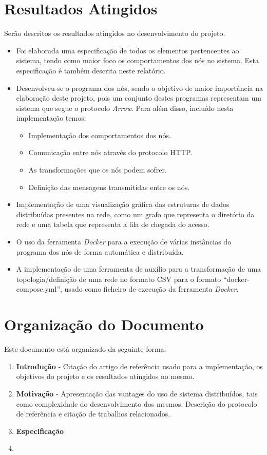 \section{Resultados Atingidos}
Serão descritos os resultados atingidos no desenvolvimento do projeto.

\begin{itemize}
    \item Foi elaborada uma especificação de todos os elementos pertencentes ao sistema, tendo como maior foco os comportamentos dos nós no sistema. Esta especificação é também descrita neste relatório. 
    \item Desenvolveu-se o programa dos nós, sendo o objetivo de maior importância na elaboração deste projeto, pois um conjunto destes programas representam um sistema que segue o protocolo \emph{Arrow}. Para além disso, incluído nesta implementação temos:

    \begin{itemize}
	\item Implementação dos comportamentos dos nós.
	\item Comunicação entre nós através do protocolo \acs{HTTP}.
	\item As transformações que os nós podem sofrer.
	\item Definição das mensagens transmitidas entre os nós.
    \end{itemize}

\item Implementação de uma visualização gráfica das estruturas de dados distribuídas presentes na rede, como um grafo que representa o diretório da rede e uma tabela que representa a fila de chegada do acesso.
\item O uso da ferramenta \emph{Docker} para a execução de várias instâncias do programa dos nós de forma automática e distribuída.
\item A implementação de uma ferramenta de auxílio para a transformação de uma topologia/definição de uma rede no formato \acs{CSV} para o formato ``docker-compose.yml'', usado como ficheiro de execução da ferramenta \emph{Docker}.

\end{itemize}




\section{Organização do Documento}
\label{sec:organ}
Este documento está organizado da seguinte forma:
\begin{enumerate}
    \item \textbf{Introdução} - Citação do artigo de referência usado para a implementação, os objetivos do projeto e os resultados atingidos no mesmo.
    \item \textbf{Motivação} - Apresentação das vantages do uso de sistema distribuídos, tais como complexidade do desenvolvimento dos mesmos. Descrição do protocolo de referência e citação de trabalhos relacionados.
    \item \textbf{Especificação} 
\item 
\end{enumerate}
